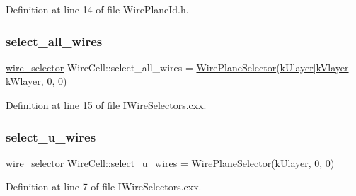 Definition at line 14 of file Wire\+Plane\+Id.\+h.

\mbox{\label{namespace_wire_cell_aa0c37dd21fca16317dff3f7a052b96bb}} 
\subsubsection{\texorpdfstring{select\+\_\+all\+\_\+wires}{select\_all\_wires}}
{\footnotesize\ttfamily \hyperlink{namespace_wire_cell_a9d7058ef4d388953ee9d03ff51509e51}{wire\+\_\+selector} Wire\+Cell\+::select\+\_\+all\+\_\+wires = \hyperlink{struct_wire_cell_1_1_wire_plane_selector}{Wire\+Plane\+Selector}(\hyperlink{namespace_wire_cell_a761397ff086f0a7e1a1d9ccd251ac618a4543784e91b7463d50a413e9eaea3229}{k\+Ulayer}$\vert$\hyperlink{namespace_wire_cell_a761397ff086f0a7e1a1d9ccd251ac618ad767a06a96af29d2fd31cbf13f4a1c86}{k\+Vlayer}$\vert$\hyperlink{namespace_wire_cell_a761397ff086f0a7e1a1d9ccd251ac618ac96acb93802a30ef1648ee1c0e81eab1}{k\+Wlayer}, 0, 0)}



Definition at line 15 of file I\+Wire\+Selectors.\+cxx.

\mbox{\label{namespace_wire_cell_a7282c5ddd00793097ad33fae7f82c6a5}} 
\subsubsection{\texorpdfstring{select\+\_\+u\+\_\+wires}{select\_u\_wires}}
{\footnotesize\ttfamily \hyperlink{namespace_wire_cell_a9d7058ef4d388953ee9d03ff51509e51}{wire\+\_\+selector} Wire\+Cell\+::select\+\_\+u\+\_\+wires = \hyperlink{struct_wire_cell_1_1_wire_plane_selector}{Wire\+Plane\+Selector}(\hyperlink{namespace_wire_cell_a761397ff086f0a7e1a1d9ccd251ac618a4543784e91b7463d50a413e9eaea3229}{k\+Ulayer}, 0, 0)}



Definition at line 7 of file I\+Wire\+Selectors.\+cxx.

\mbox{\label{namespace_wire_cell_a198de2e1656a8a001632e88fe21384e7}} 

